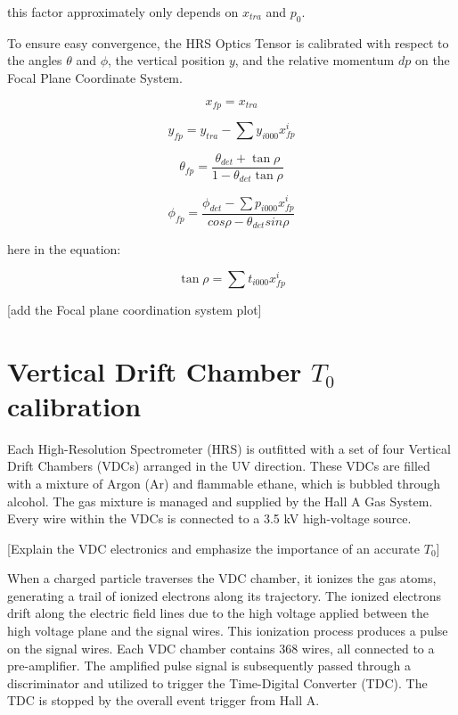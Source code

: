 this factor approximately only depends on $x_{tra}$ and $p_0$.

To ensure easy convergence, the HRS Optics Tensor is calibrated with respect to the angles $\theta$ and $\phi$, the vertical position $y$, and the relative momentum $dp$ on the Focal Plane Coordinate System.

\begin{equation}
    x_{fp} = x_{tra}    \label{eq:cpt3_fps_1}
\end{equation}

\begin{equation}
    y_{fp} = y_{tra} - \sum y_{i000}x^i_{fp}  
\end{equation}

\begin{equation}
\theta_{fp} = \frac{\theta_{det} + \tan\rho}{1 - \theta_{det}\tan\rho}
\end{equation}


\begin{equation}
    \phi_{fp} = \frac{\phi_{det} - \sum p_{i000}x^i_{fp}}{cos \rho - \theta_{det} sin\rho}
\end{equation}

here  in the equation:

\begin{equation}
    \tan\rho  = \sum t_{i000}x^i_{fp} \label{eq:cpt3_fps_5}
\end{equation}

[add the Focal plane coordination system plot]


\section{Vertical Drift Chamber $T_0$ calibration}

Each High-Resolution Spectrometer (HRS) is outfitted with a set of four Vertical Drift Chambers (VDCs) arranged in the UV direction. These VDCs are filled with a mixture of Argon (Ar) and flammable ethane, which is bubbled through alcohol. The gas mixture is managed and supplied by the Hall A Gas System. Every wire within the VDCs is connected to a 3.5 kV high-voltage source.

[Explain the VDC electronics and emphasize the importance of an accurate $T_0$]

When a charged particle traverses the VDC chamber, it ionizes the gas atoms, generating a trail of ionized electrons along its trajectory. The ionized electrons drift along the electric field lines due to the high voltage applied between the high voltage plane and the signal wires. This ionization process produces a pulse on the signal wires. Each VDC chamber contains 368 wires, all connected to a pre-amplifier. The amplified pulse signal is subsequently passed through a discriminator and utilized to trigger the Time-Digital Converter (TDC). The TDC is stopped by the overall event trigger from Hall A.

